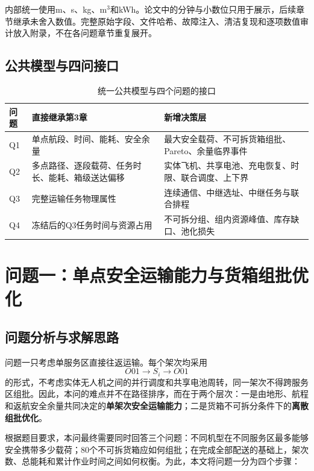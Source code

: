 \documentclass[UTF8,a4paper,12pt]{ctexart}
\begin{document}
内部统一使用m、s、kg、m$^3$和kWh。论文中的分钟与小数位只用于展示，后续章节继承未舍入数值。完整原始字段、文件哈希、故障注入、清洁复现和逐项数值审计放入附录，不在各问题章节重复展开。

\subsection{公共模型与四问接口}

\begin{table}[H]
\centering
\caption{统一公共模型与四个问题的接口}
\label{tab:common_interface}
\begin{tabular}{p{1.3cm}p{6.0cm}p{7.0cm}}
\toprule
问题 & 直接继承第3章 & 新增决策层\\
\midrule
Q1 & 单点航段、时间、能耗、安全余量 & 最大安全载荷、不可拆货箱组批、Pareto、余量临界事件\\
Q2 & 多点路径、逐段载荷、任务时长、能耗、箱级送达偏移 & 实体飞机、共享电池、充电恢复、时限、联合调度、上下界\\
Q3 & 完整运输任务物理属性 & 连续通信、中继选址、中继任务与联合排程\\
Q4 & 冻结后的Q3任务时间与资源占用 & 不可拆分组、组内资源峰值、库存缺口、池化损失\\
\bottomrule
\end{tabular}
\end{table}

\clearpage
\section{问题一：单点安全运输能力与货箱组批优化}
\label{sec:q1}

\subsection{问题分析与求解思路}

问题一只考虑单服务区直接往返运输。每个架次均采用
\[
O01\rightarrow S_i\rightarrow O01
\]
的形式，不考虑实体无人机之间的并行调度和共享电池周转，同一架次不得跨服务区组批。因此，本问的难点并不在路径排序，而在于两个层次：一是由地形、航程和返航安全余量共同决定的\textbf{单架次安全运输能力}；二是货箱不可拆分条件下的\textbf{离散组批优化}。

根据题目要求，本问最终需要同时回答三个问题：不同机型在不同服务区最多能够安全携带多少载荷；80个不可拆货箱应如何组批；在完成全部配送的基础上，架次数、总能耗和累计作业时间之间如何权衡。为此，本文将问题一分为四个步骤：
\end{document}
